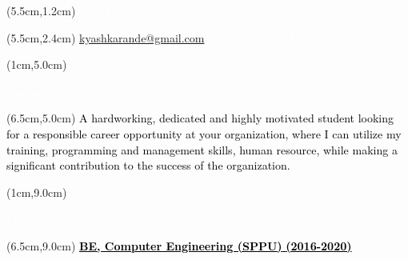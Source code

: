\documentclass[10pt,a4paper,twocolumn]{article}
\begin{document}
\begin{center}
\begin{textblock*}{10cm}(5.5cm,1.2cm)
   \textcolor{white}{\fontsize{30}{40}\selectfont Yash Karande}
\end{textblock*}
\begin{textblock*}{10cm}(5.5cm,2.4cm)
\textcolor{white}{\fontsize{12}{15}\selectfont \href {mailto:kyashkarande@gmail.com} {kyashkarande@gmail.com} | +91-8668230701}
\end{textblock*}
\end{center}
\begin{textblock*}{3.9cm}(1cm,5.0cm)
   \begin{mdframed}[style=Frame1]
   \textcolor{white}{\fontsize{20}{20}\selectfont Summary }
   \end{mdframed}
\end{textblock*}
\begin{textblock*}{14cm}(6.5cm,5.0cm)
   \textcolor{black}{\fontsize{15}{20}\selectfont A hardworking, dedicated and highly motivated student looking for a responsible career opportunity at your organization, where I can utilize my training, programming and management skills, human resource, while making a significant contribution to the success of the organization.}
\end{textblock*}
\begin{textblock*}{4cm}(1cm,9.0cm)
   \begin{mdframed}[style=Frame1]
   \textcolor{white}{\fontsize{20}{20}\selectfont Education}
   \end{mdframed}
\end{textblock*}
\begin{textblock*}{14cm}(6.5cm,9.0cm)
   \textcolor{black}{\fontsize{15}{20}\selectfont \underline{\textbf{BE, Computer Engineering (SPPU)} \hspace{25mm}\textbf{(2016-2020)}}\vspace{1mm} }
\end{textblock*}
\end{document}
